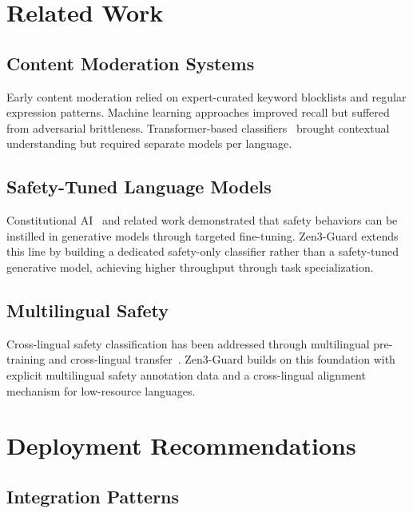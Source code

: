 \documentclass[11pt,a4paper]{article}
\begin{document}
\section{Related Work}
\label{sec:related}

\subsection{Content Moderation Systems}

Early content moderation relied on expert-curated keyword blocklists and regular
expression patterns. Machine learning approaches improved recall but suffered from
adversarial brittleness. Transformer-based classifiers~\cite{perspectiveapi} brought
contextual understanding but required separate models per language.

\subsection{Safety-Tuned Language Models}

Constitutional AI~\cite{bai2022constitutional} and related work demonstrated that
safety behaviors can be instilled in generative models through targeted fine-tuning.
Zen3-Guard extends this line by building a dedicated safety-only classifier rather
than a safety-tuned generative model, achieving higher throughput through task specialization.

\subsection{Multilingual Safety}

Cross-lingual safety classification has been addressed through multilingual pre-training
and cross-lingual transfer~\cite{multilingual-safety}. Zen3-Guard builds on this
foundation with explicit multilingual safety annotation data and a cross-lingual
alignment mechanism for low-resource languages.

\section{Deployment Recommendations}
\label{sec:deploy}

\subsection{Integration Patterns}
\end{document}
